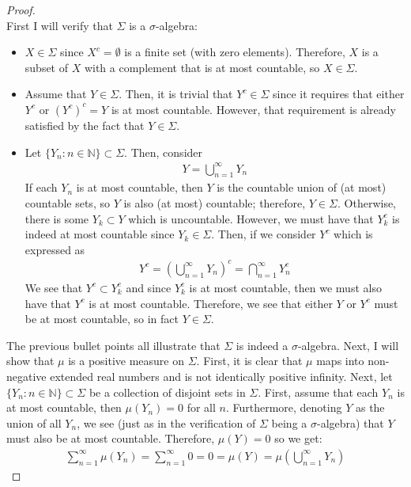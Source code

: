 \documentclass[10pt,a4paper]{article}
\theoremstyle{definition}
\theoremstyle{definition}
\numberwithin{equation}{section}
\begin{document}
\begin{proof}$ $
\\First I will verify that $\Sigma$ is a $\sigma$-algebra:
\begin{itemize}
\item $X \in \Sigma$ since $X^c = \emptyset$ is a finite set (with zero elements). Therefore, $X$ is a subset of $X$ with a complement that is at most countable, so $X \in \Sigma$. 
\item Assume that $Y \in \Sigma$. Then, it is trivial that $Y^c \in \Sigma$ since it requires that either $Y^c$ or $(Y^c)^c = Y$ is at most countable. However, that requirement is already satisfied by the fact that $Y \in \Sigma$. 
\item Let $\{Y_n : n \in \mathbb{N}\} \subset \Sigma$.  Then, consider
\begin{align*}
Y = \bigcup_{n = 1}^\infty Y_n
\end{align*}
If each $Y_n$ is at most countable, then $Y$ is the countable union of (at most) countable sets, so $Y$ is also (at most) countable; therefore, $Y \in \Sigma$. Otherwise, there is some $Y_k \subset Y$ which is uncountable. However, we must have that $Y_k^c$ is indeed at most countable since $Y_k \in \Sigma$. Then, if we consider $Y^c$ which is expressed as 
\begin{align*}
Y^c = \left(\bigcup_{n = 1}^\infty Y_n \right)^c = \bigcap_{n = 1}^\infty Y_n^c
\end{align*}
We see that $Y^c \subset Y_k^c$ and since $Y_k^c$ is at most countable, then we must also have that $Y^c$ is at most countable. Therefore, we see that either $Y$ or $Y^c$ must be at most countable, so in fact $Y \in \Sigma$. 
\end{itemize}
The previous bullet points all illustrate that $\Sigma$ is indeed a $\sigma$-algebra. Next, I will show that $\mu$ is a positive measure on $\Sigma$. First, it is clear that $\mu$ maps into non-negative extended real numbers and is not identically positive infinity. Next, let $\{Y_n : n \in \mathbb{N}\} \subset \Sigma$ be a collection of disjoint sets in $\Sigma$. First, assume that each $Y_n$ is at most countable, then $\mu(Y_n) = 0$ for all $n$. Furthermore, denoting $Y$ as the union of all $Y_n$, we see (just as in the verification of $\Sigma$ being a $\sigma$-algebra) that $Y$ must also be at most countable. Therefore, $\mu(Y) = 0$ so we get:
\begin{align*}
\sum_{n = 1}^\infty \mu(Y_n) = \sum_{n = 1}^\infty 0 = 0 = \mu(Y) = \mu\left(\bigcup_{n = 1}^\infty Y_n \right)

\end{align*}
\end{proof}
\end{document}
